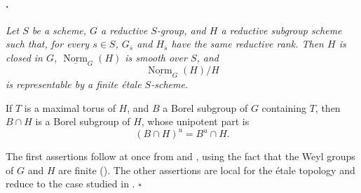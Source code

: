 \paragraph{.}
{\itshape Let \(S\) be a scheme, \(G\) a reductive \(S\)-group,
and \(H\) a reductive subgroup scheme such that, for every
\(s\in S\), \(G_{\bar s}\) and \(H_{\bar s}\) have the same
reductive rank. Then \(H\) is closed in \(G\),
\(\underline{\operatorname{Norm}}_G(H)\) is smooth over \(S\), and
\[
  \underline{\operatorname{Norm}}_G(H)/H
\]
is representable by a finite étale \(S\)-scheme.

If \(T\) is a maximal torus of \(H\), and \(B\) a Borel subgroup of
\(G\) containing \(T\), then \(B\cap H\) is a Borel subgroup of
\(H\), whose unipotent part is
\[
  (B\cap H)^u=B^u\cap H.
\]}

The first assertions follow at once from  and , using
the fact that the Weyl groups of \(G\) and \(H\) are finite
\textup{()}. The other assertions are local for the
étale topology and reduce to the case studied in .
\hfill\(\square\)


